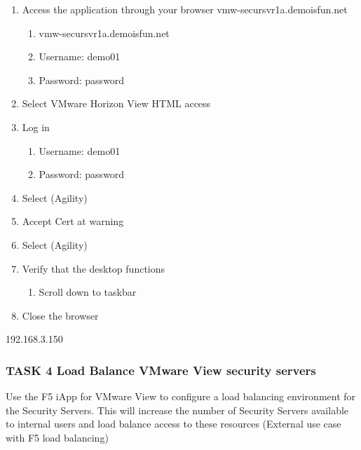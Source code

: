 \documentclass[letterpaper,10pt,english]{sphinxmanual}
\begin{document}
\begin{enumerate}
\item {} 
Access the application through your browser 
vmw-secursvr1a.demoisfun.net
\begin{enumerate}
\item {} 
vmw-secursvr1a.demoisfun.net

\item {} 
Username: demo01

\item {} 
Password: password

\end{enumerate}

\item {} 
Select VMware Horizon View HTML access

\item {} 
Log in
\begin{enumerate}
\item {} 
Username: demo01

\item {} 
Password: password

\end{enumerate}

\item {} 
Select (Agility)

\item {} 
Accept Cert at warning

\item {} 
Select (Agility)

\item {} 
Verify that the desktop functions
\begin{enumerate}
\item {} 
Scroll down to taskbar

\end{enumerate}

\item {} 
Close the browser

\end{enumerate}

192.168.3.150


\subsubsection{TASK 4 \textendash{} Load Balance VMware View security servers}
\label{\detokenize{class2/module1/lab1:task-4-load-balance-vmware-view-security-servers}}
Use the F5 iApp for VMware View to configure a load balancing
environment for the Security Servers. This will increase the number of
Security Servers available to internal users and load balance access to
these resources (External use case with F5 load balancing)
\end{document}
